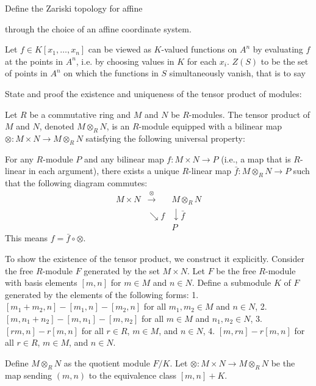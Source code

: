 Define the Zariski topology for affine 


through the choice of an affine coordinate system. 

Let \(f \in K[x_1, \dots, x_n]\) can be viewed as \(K\)-valued functions on \(A^{n}\) by evaluating \(f\) at the points in \(A^n\), i.e. by choosing values in \(K\) for each \(x_i\). 
\(Z(S)\) to be the set of points in \(A^n\) on which the functions in \(S\) simultaneously vanish, that is to say



State and proof the existence and uniqueness of the tensor product of modules:

Let \( R \) be a commutative ring and \( M \) and \( N \) be \( R \)-modules. The tensor product of \( M \) and \( N \), denoted \( M \otimes_R N \), is an \( R \)-module equipped with a bilinear map \( \otimes: M \times N \to M \otimes_R N \) satisfying the following universal property:

For any \( R \)-module \( P \) and any bilinear map \( f: M \times N \to P \) (i.e., a map that is \( R \)-linear in each argument), there exists a unique \( R \)-linear map \( \bar{f}: M \otimes_R N \to P \) such that the following diagram commutes:
\[
\begin{array}{ccc}
M \times N & \xrightarrow{\otimes} & M \otimes_R N \\
 & \searrow f & \downarrow \bar{f} \\
 & & P
\end{array}
\]
This means \( f = \bar{f} \circ \otimes \).

To show the existence of the tensor product, we construct it explicitly. Consider the free \( R \)-module \( F \) generated by the set \( M \times N \). Let \( F \) be the free \( R \)-module with basis elements \( [m, n] \) for \( m \in M \) and \( n \in N \). Define a submodule \( K \) of \( F \) generated by the elements of the following forms:
1. \( [m_1 + m_2, n] - [m_1, n] - [m_2, n] \) for all \( m_1, m_2 \in M \) and \( n \in N \),
2. \( [m, n_1 + n_2] - [m, n_1] - [m, n_2] \) for all \( m \in M \) and \( n_1, n_2 \in N \),
3. \( [rm, n] - r[m, n] \) for all \( r \in R \), \( m \in M \), and \( n \in N \),
4. \( [m, rn] - r[m, n] \) for all \( r \in R \), \( m \in M \), and \( n \in N \).

Define \( M \otimes_R N \) as the quotient module \( F / K \). Let \( \otimes: M \times N \to M \otimes_R N \) be the map sending \( (m, n) \) to the equivalence class \( [m, n] + K \). 

